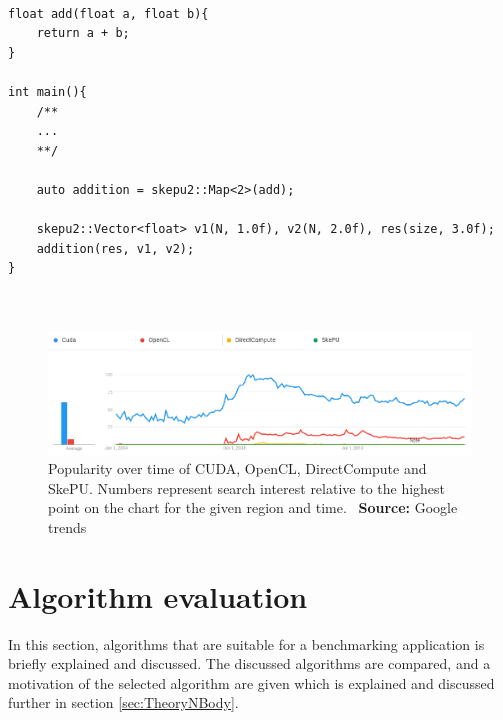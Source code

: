 \begin{lstlisting}[caption={SkePU vector addition}, label={lst:SkePUVectorAdd}, frame=single] 

float add(float a, float b){
	return a + b;
}

int main(){
    /**
    ...
    **/
    
    auto addition = skepu2::Map<2>(add);
    
    skepu2::Vector<float> v1(N, 1.0f), v2(N, 2.0f), res(size, 3.0f);
    addition(res, v1, v2);
}



\end{lstlisting}

\begin{figure}[!htbp]
    \centering
    \includegraphics[width=\textwidth]{Theory/Figs/GoogleTrendsComparison.png}
    \caption{Popularity over time of CUDA, OpenCL, DirectCompute and SkePU. Numbers represent search interest relative to the highest point on the chart for the given region and time. \ \textbf{Source:} Google trends}
    \label{fig:GoogleTrendsPopularity}
\end{figure}



\section{Algorithm evaluation}
In this section, algorithms that are suitable for a benchmarking application is briefly explained and discussed. The discussed algorithms are compared, and a motivation of the selected algorithm are given which is explained and discussed further in section \ref{sec:TheoryNBody}.

